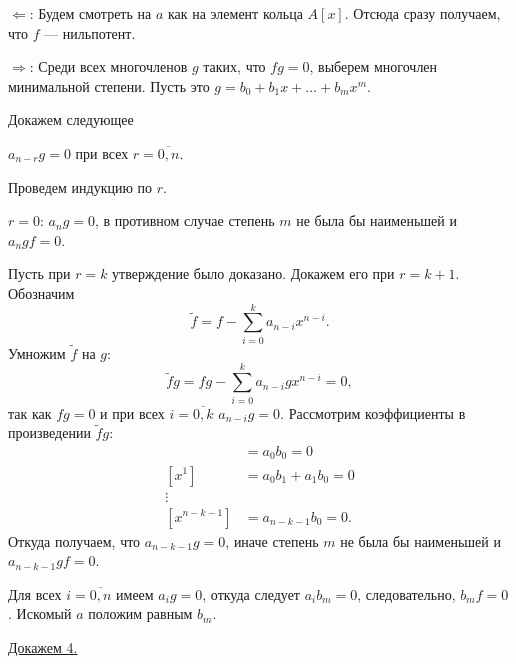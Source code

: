     \begin{Proof}

        $\Leftarrow$: Будем смотреть на $a$ как на элемент кольца $A[x]$. Отсюда сразу получаем, что $f$ --- нильпотент.

        $\Rightarrow$: Среди всех многочленов $g$ таких, что $fg = 0$, выберем многочлен минимальной степени. Пусть это $g = b_0 + b_1x + \dots + b_mx^m$.

        Докажем следующее
        \begin{Statement}
            $a_{n - r}g = 0$  при всех $r = \overline{0, n}$.
        \end{Statement}
        \begin{Proof}
            Проведем индукцию по $r$.

            $r = 0$: $a_ng = 0$, в противном случае степень $m$ не была бы наименьшей и $a_ngf = 0$.
            
            Пусть при $r = k$ утверждение было доказано. Докажем его при $r = k + 1$.
            Обозначим 
            $$
                \tilde{f} = f - \sum_{i=0}^{k} a_{n-i}x^{n-i}.
            $$ 
            Умножим $\tilde{f}$ на $g$:
            $$
                \tilde{f}g = fg - \sum_{i=0}^{k} a_{n-i}gx^{n-i} = 0,
            $$
            так как $fg = 0$ и при всех $i = \overline{0, k}$ $a_{n-i}g = 0$. Рассмотрим коэффициенты в произведении $\tilde{f}g$:
            \begin{align*}
                [x^0] &= a_0b_0 = 0\\
                [x^1] &= a_0b_1 + a_1b_0 = 0\\
                \vdots\\
                [x^{n - k - 1}] &= a_{n - k - 1}b_0 = 0.
            \end{align*}
            Откуда получаем, что $a_{n - k - 1}g = 0$, иначе степень $m$ не была бы наименьшей и \\ $a_{n-k-1}gf = 0$. 
        \end{Proof}

        Для всех $i = \overline{0, n}$ имеем $a_ig = 0$, откуда следует $a_ib_m = 0$, следовательно, $b_mf = 0$. Искомый $a$ положим равным $b_m$.
    \end{Proof}
    \underline{Докажем 4.}
